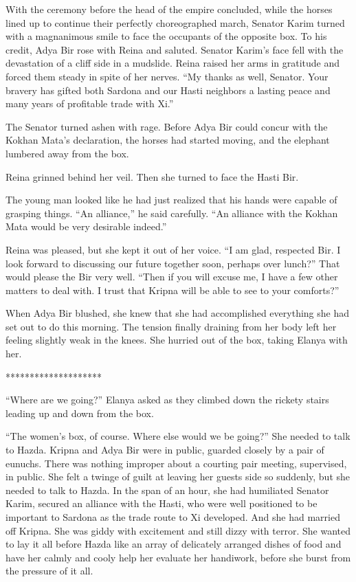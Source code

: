 \documentclass{article}
\begin{document}
	With the ceremony before the head of the empire concluded, while the horses lined up to continue their perfectly choreographed march, Senator Karim turned with a magnanimous smile to face the occupants of the opposite box. To his credit, Adya Bir rose with Reina and saluted. Senator Karim’s face fell with the devastation of a cliff side in a mudslide. Reina raised her arms in gratitude and forced them steady in spite of her nerves. “My thanks as well, Senator. Your bravery has gifted both Sardona and our Hasti neighbors a lasting peace and many years of profitable trade with Xi.” 
	
	The Senator turned ashen with rage. Before Adya Bir could concur with the Kokhan Mata’s declaration, the horses had started moving, and the elephant lumbered away from the box.
	
	Reina grinned behind her veil. Then she turned to face the Hasti Bir. 
	
	The young man looked like he had just realized that his hands were capable of grasping things. “An alliance,” he said carefully. “An alliance with the Kokhan Mata would be very desirable indeed.” 
	
	Reina was pleased, but she kept it out of her voice. “I am glad, respected Bir. I look forward to discussing our future together soon, perhaps over lunch?” That would please the Bir very well. “Then if you will excuse me, I have a few other matters to deal with. I trust that Kripna will be able to see to your comforts?” 
	
	When Adya Bir blushed, she knew that she had accomplished everything she had set out to do this morning. The tension finally draining from her body left her feeling slightly weak in the knees. She hurried out of the box, taking Elanya with her.
	
	********************
	
	“Where are we going?” Elanya asked as they climbed down the rickety stairs leading up and down from the box. 
	
	“The women’s box, of course. Where else would we be going?” She needed to talk to Hazda. Kripna and Adya Bir were in public, guarded closely by a pair of eunuchs. There was nothing improper about a courting pair meeting, supervised, in public. She felt a twinge of guilt at leaving her guests side so suddenly, but she needed to talk to Hazda. In the span of an hour, she had humiliated Senator Karim, secured an alliance with the Hasti, who were well positioned to be important to Sardona as the trade route to Xi developed. And she had married off Kripna. She was giddy with excitement and still dizzy with terror. She wanted to lay it all before Hazda like an array of delicately arranged dishes of food and have her calmly and cooly help her evaluate her handiwork, before she burst from the pressure of it all.
	
\end{document}
